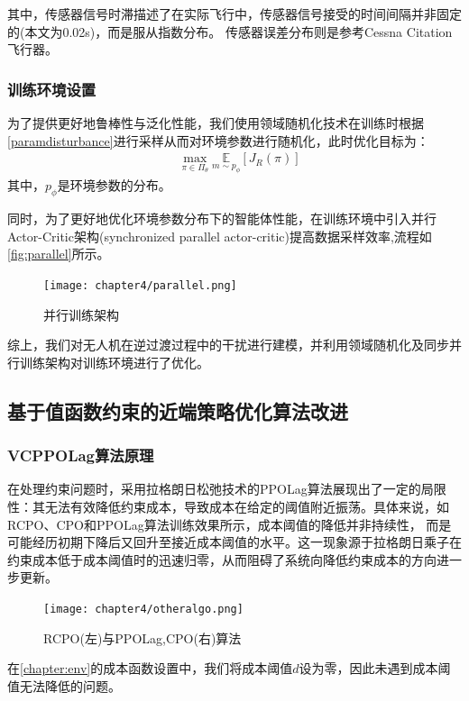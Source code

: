 其中，传感器信号时滞描述了在实际飞行中，传感器信号接受的时间间隔并非固定的(本文为0.02s)，而是服从指数分布\cite{bohn2023data}。
传感器误差分布则是参考Cessna Citation飞行器\cite{lee2021online}。

\subsubsection{训练环境设置}
为了提供更好地鲁棒性与泛化性能，我们使用领域随机化技术在训练时根据\autoref{paramdisturbance}进行采样从而对环境参数进行随机化，此时优化目标为：
\begin{align}
    &\max _{\pi \in \Pi_{\theta}} \underset{m \sim p_{\phi}}{\mathbb{E}}\left [J_{R}(\pi)   \right ] 
\end{align}
其中，$p_{\phi}$是环境参数的分布。

同时，为了更好地优化环境参数分布下的智能体性能，在训练环境中引入并行Actor-Critic架构(synchronized parallel actor-critic)提高数据采样效率,流程如\autoref{fig:parallel}所示。
\begin{figure}[htbp]
    \centering
    \texttt{[image: chapter4/parallel.png]}
    \caption{\label{fig:parallel}并行训练架构}
    \label{fig:action}
\end{figure}

综上，我们对无人机在逆过渡过程中的干扰进行建模，并利用领域随机化及同步并行训练架构对训练环境进行了优化。
\subsection{基于值函数约束的近端策略优化算法改进}
\subsubsection{VCPPOLag算法原理}
在处理约束问题时，采用拉格朗日松弛技术的PPOLag算法展现出了一定的局限性：其无法有效降低约束成本，导致成本在给定的阈值附近振荡。具体来说，如
RCPO\cite{tessler2018reward}、CPO\cite{achiam2017constrained}和PPOLag算法训练效果所示，成本阈值的降低并非持续性，
而是可能经历初期下降后又回升至接近成本阈值的水平。这一现象源于拉格朗日乘子在约束成本低于成本阈值时的迅速归零，从而阻碍了系统向降低约束成本的方向进一步更新。
\begin{figure}[htbp]
    \centering
    \texttt{[image: chapter4/otheralgo.png]}
    \caption{\label{fig:otheralgo}RCPO(左)与PPOLag,CPO(右)算法}
\end{figure}

在\autoref{chapter:env}的成本函数设置中，我们将成本阈值$d$设为零，因此未遇到成本阈值无法降低的问题。

